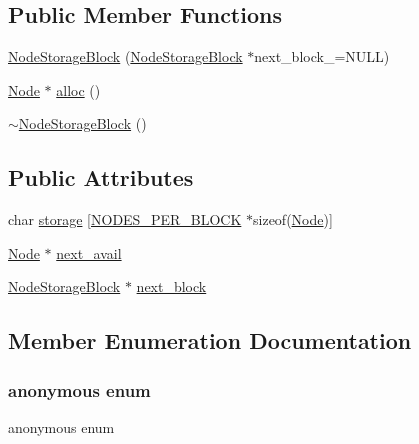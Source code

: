 \subsection*{Public Member Functions}
\begin{DoxyCompactItemize}
\item 
\hyperlink{structtrimesh_1_1KDtree_1_1NodeStorageBlock_aa55acd82ca99ee62cb9cba7d2ab388f0}{Node\+Storage\+Block} (\hyperlink{structtrimesh_1_1KDtree_1_1NodeStorageBlock}{Node\+Storage\+Block} $\ast$next\+\_\+block\+\_\+=N\+U\+LL)
\item 
\hyperlink{structtrimesh_1_1KDtree_1_1Node}{Node} $\ast$ \hyperlink{structtrimesh_1_1KDtree_1_1NodeStorageBlock_aa83641f8f90fd796f7c67191cd69b1c3}{alloc} ()
\item 
\hyperlink{structtrimesh_1_1KDtree_1_1NodeStorageBlock_aa0bf346b84fbe08bc70a097d160a0c79}{$\sim$\+Node\+Storage\+Block} ()
\end{DoxyCompactItemize}
\subsection*{Public Attributes}
\begin{DoxyCompactItemize}
\item 
char \hyperlink{structtrimesh_1_1KDtree_1_1NodeStorageBlock_a0958126dfe8d25e2f58c8f03f45869a0}{storage} \mbox{[}\hyperlink{structtrimesh_1_1KDtree_1_1NodeStorageBlock_a0fc26f8428cdf04b3e99d1b57770292fabed02221dc8cfae72d1a32f807c5316f}{N\+O\+D\+E\+S\+\_\+\+P\+E\+R\+\_\+\+B\+L\+O\+CK} $\ast$sizeof(\hyperlink{structtrimesh_1_1KDtree_1_1Node}{Node})\mbox{]}
\item 
\hyperlink{structtrimesh_1_1KDtree_1_1Node}{Node} $\ast$ \hyperlink{structtrimesh_1_1KDtree_1_1NodeStorageBlock_a31661d8155b48fafa14aa6f066ffc5eb}{next\+\_\+avail}
\item 
\hyperlink{structtrimesh_1_1KDtree_1_1NodeStorageBlock}{Node\+Storage\+Block} $\ast$ \hyperlink{structtrimesh_1_1KDtree_1_1NodeStorageBlock_aeb244f2daeda3453d676b40c7de5c3ad}{next\+\_\+block}
\end{DoxyCompactItemize}


\subsection{Member Enumeration Documentation}
\mbox{\label{structtrimesh_1_1KDtree_1_1NodeStorageBlock_a0fc26f8428cdf04b3e99d1b57770292f}} 
\subsubsection{\texorpdfstring{anonymous enum}{anonymous enum}}
{\footnotesize\ttfamily anonymous enum}

